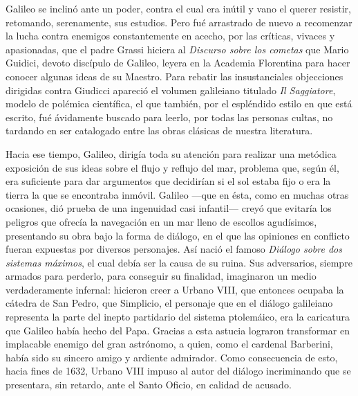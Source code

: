 \documentclass[a4paper, 12pt, draft]{article}
\begin{document}
{Galileo se inclinó ante un poder, contra el cual era inútil y vano el querer resistir, retomando, serenamente, sus estudios. Pero fué arrastrado de nuevo a recomenzar la lucha contra enemigos constantemente en acecho, por las críticas, vivaces y apasionadas, que el padre Grassi hiciera al \textit{ Discurso sobre los cometas} que Mario Guidici, devoto discípulo de Galileo, leyera en la Academia Florentina para hacer conocer algunas ideas de su Maestro. Para rebatir las insustanciales objecciones dirigidas contra Giudicci apareció el volumen galileiano titulado \textit{ Il Saggiatore}, modelo de polémica científica, el que también, por el espléndido estilo en que está escrito, fué ávidamente buscado para leerlo, por todas las personas cultas, no tardando en ser catalogado entre las obras clásicas de nuestra literatura.

Hacia ese tiempo, Galileo, dirigía toda su atención para realizar una metó\-dica exposición de sus ideas sobre el flujo y reflujo del mar, problema que, según él, era suficiente para dar argumentos que decidirían si el sol estaba fijo o era la tierra la que se encontraba inmóvil. Galileo ---que en ésta, como en muchas otras ocasiones, dió prueba de una ingenuidad casi infantil--- creyó que evitaría los peligros que ofrecía la navegación en un mar lleno de escollos agudísimos, presentando su obra bajo la forma de diálogo, en el que las opiniones en conflicto fueran expuestas por diversos personajes. Así nació el famoso \textit{ Diálogo sobre dos sistemas máximos}, el cual debía ser la causa de su ruina. Sus adversarios, siempre armados para perderlo, para conseguir su finalidad, imaginaron un medio verdaderamente infernal: hicieron creer a Urbano VIII, que entonces ocupaba la cátedra de San Pedro, que Simplicio, el personaje que en el diálogo galileiano representa la parte del inepto partidario del sistema ptolemáico, era la caricatura que Galileo había hecho del Papa. Gracias a esta astucia lograron transformar en implacable enemigo del gran astrónomo, a quien, como el cardenal Barberini, había sido su sincero amigo y ardiente admirador. Como consecuencia de esto, hacia fines de 1632, Urbano VIII impuso al autor del diálogo incriminando que se presentara, sin retardo, ante el Santo Oficio, en calidad de acusado.

}
\end{document}
